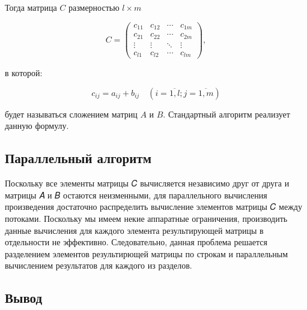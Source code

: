 Тогда матрица $C$ размерностью $l \times m$

\begin{equation}
    C =
      \begin{pmatrix}
        c_{11} & c_{12} & \cdots & c_{1m} \\
        c_{21} & c_{22} & \cdots & c_{2m} \\
        \vdots & \vdots & \ddots & \vdots \\
        c_{l1} & c_{l2} & \cdots & c_{lm}
      \end{pmatrix},
\end{equation}

в которой:

\begin{equation}
    \displaystyle
    c_{ij} = a_{ij} + b_{ij}\quad (i = \overline{1, l}; j = \overline{1, m} )
\end{equation}

будет называться сложением матриц $A$ и $B$. Стандартный алгоритм
реализует данную формулу.

\subsection{Параллельный алгоритм}

Поскольку все элементы матрицы 𝐶 вычисляется независимо друг от друга  и матрицы 𝐴 и
𝐵 остаются неизменными, для параллельного вычисления произведения достаточно 
распределить вычисление элементов матрицы 𝐶 между потоками.
Поскольку мы имеем некие аппаратные ограничения, производить данные вычисления для каждого
элемента результирующей матрицы в отдельности не эффективно. Следовательно, данная проблема решается разделением  элементов результирющей матрицы по строкам и параллельным вычислением результатов для каждого из разделов.
\subsection{Вывод}

